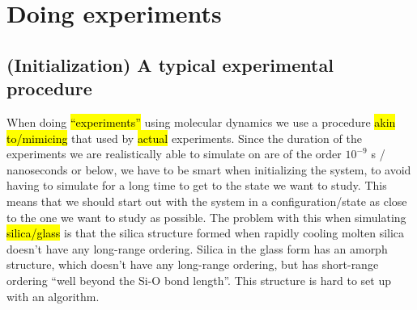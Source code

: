 \chapter{Doing experiments}
\section{(Initialization) A typical experimental procedure\label{sec:experimental_procedure}}
When doing \hl{``experiments''} using molecular dynamics we use a procedure \hl{akin to/mimicing} that used by \hl{actual} experiments. Since the duration of the experiments we are realistically able to simulate on are of the order $10^{-9}$ s / nanoseconds or below, we have to be smart when initializing the system, to avoid having to simulate for a long time to get to the state we want to study. This means that we should start out with the system in a configuration/state as close to the one we want to study as possible. The problem with this when simulating \hl{silica/glass} is that the silica structure formed when rapidly cooling molten silica doesn't have any long-range ordering. Silica in the glass form has an amorph structure, which doesn't have any long-range ordering, but has short-range ordering ``well beyond the Si-O bond length''. This structure is hard to set up with an algorithm.
%
%         
%         

